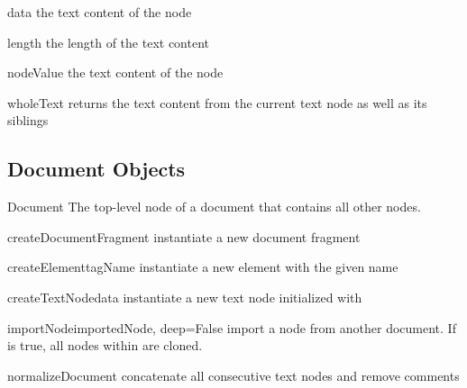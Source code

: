 \begin{memberdesc}[Text]{data}
the text content of the node
\end{memberdesc}

\begin{memberdesc}[Text]{length}
the length of the text content
\end{memberdesc}

\begin{memberdesc}[Text]{nodeValue}
the text content of the node
\end{memberdesc}

\begin{memberdesc}[Text]{wholeText}
returns the text content from the current text node as well as its siblings
\end{memberdesc}


\subsection{Document Objects}

\begin{classdesc}{Document}{}
The top-level node of a document that contains all other nodes.
\end{classdesc}

\begin{methoddesc}[Document]{createDocumentFragment}{}
instantiate a new document fragment
\end{methoddesc}

\begin{methoddesc}[Document]{createElement}{tagName}
instantiate a new element with the given name
\end{methoddesc}

\begin{methoddesc}[Document]{createTextNode}{data}
instantiate a new text node initialized with 
\end{methoddesc}

\begin{methoddesc}[Document]{importNode}{importedNode, deep=False}
import a node from another document.  If  is true, all nodes
within  are cloned.
\end{methoddesc}

\begin{methoddesc}[Document]{normalizeDocument}{}
concatenate all consecutive text nodes and remove comments
\end{methoddesc}



